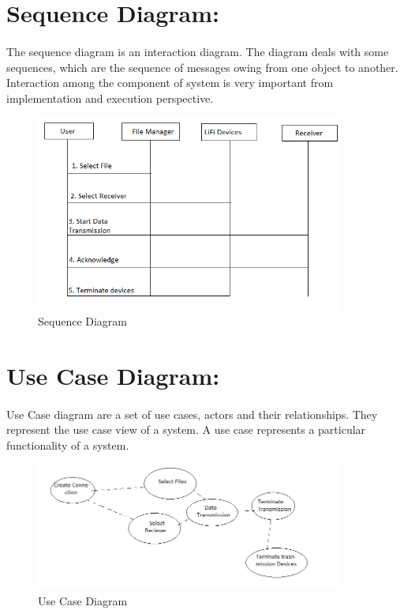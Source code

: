\documentclass[11pt,a4paper]{report}
\begin{document}
\section*{Sequence Diagram:}
\paragraph{}The sequence diagram is an interaction diagram. The diagram deals with some sequences, which are the sequence of messages owing from one object to another. Interaction among the component of system is very important from implementation and execution perspective.
\begin{figure}[h]
	\centering
	\includegraphics[width=4in]{sequence.png}
	\begin{center}\caption{Sequence Diagram} \end{center}
	\label{LABEL}
\end{figure}
\section*{Use Case Diagram:}
\paragraph{}Use Case diagram are a set of use cases, actors and their relationships. They represent the use case view of a system. A use case represents a particular functionality of a system.
\begin{figure}[h]
	\centering
	\includegraphics[width=4in]{Use_Case.png}
	\begin{center}\caption{Use Case Diagram} \end{center}
	\label{LABEL}
\end{figure}
\end{document}
